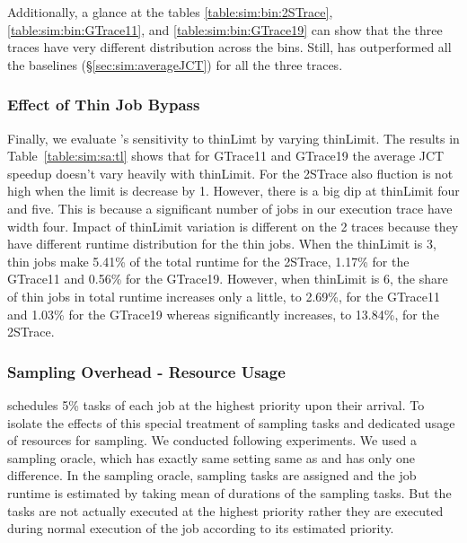 Additionally, a glance at the tables \ref{table:sim:bin:2STrace},
\ref{table:sim:bin:GTrace11}, and \ref{table:sim:bin:GTrace19} can show that the
three traces have very different distribution across the bins. Still, \slearn
has outperformed all the baselines (\S\ref{sec:sim:averageJCT}) for all the
three traces. 


\subsubsection{Effect of Thin Job Bypass}
\label{sec:sim:thin}

Finally,
we evaluate \slearn's sensitivity to thinLimt by varying thinLimit. The results
in Table~\ref{table:sim:sa:tl} shows that for GTrace11 and GTrace19 the average
JCT speedup doesn't vary heavily with thinLimit. For the 2STrace also fluction
is not high when the limit is decrease by 1. However, there is a big dip at
thinLimit four and five.  This is because a significant number of jobs in our
execution trace have width four. Impact of thinLimit variation is different on
the 2 traces because they have different runtime distribution for the thin
jobs. When the thinLimit is 3, thin jobs make 5.41\% of the total runtime for
the 2STrace, 1.17\% for the GTrace11 and 0.56\% for the GTrace19. However, when
thinLimit is 6, the share of thin jobs in total runtime increases only a
little, to 2.69\%, for the GTrace11 and 1.03\% for the GTrace19 whereas
significantly increases, to 13.84\%, for the 2STrace.


\subsubsection{Sampling Overhead - Resource Usage}
\label{sec:sim:resource}

\slearn schedules 5\% tasks of each job at the highest priority upon their
arrival. To isolate the effects of this special treatment of sampling tasks and
dedicated usage of resources for sampling. We conducted following experiments.
We used a sampling oracle, which has exactly same setting same as \slearn and has
only one difference. In the sampling oracle, sampling tasks are assigned and
the job runtime is estimated by taking mean of durations of the sampling tasks.
But the tasks are not actually executed at the highest priority rather they are
executed during normal execution of the job according to its estimated priority.

